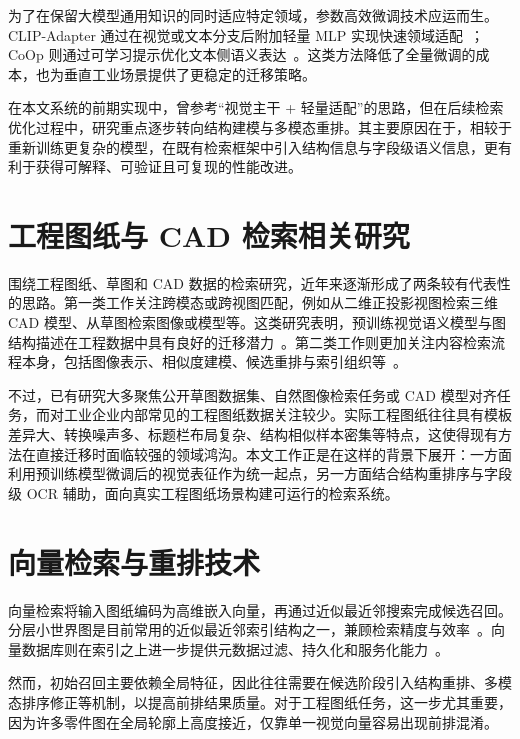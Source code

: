 为了在保留大模型通用知识的同时适应特定领域，参数高效微调技术应运而生。CLIP-Adapter 通过在视觉或文本分支后附加轻量 MLP 实现快速领域适配~\citep{gao2024clipadapter}；CoOp 则通过可学习提示优化文本侧语义表达~\citep{zhou2022coop}。这类方法降低了全量微调的成本，也为垂直工业场景提供了更稳定的迁移策略。

在本文系统的前期实现中，曾参考“视觉主干 + 轻量适配”的思路，但在后续检索优化过程中，研究重点逐步转向结构建模与多模态重排。其主要原因在于，相较于重新训练更复杂的模型，在既有检索框架中引入结构信息与字段级语义信息，更有利于获得可解释、可验证且可复现的性能改进。

\section{工程图纸与 CAD 检索相关研究}

围绕工程图纸、草图和 CAD 数据的检索研究，近年来逐渐形成了两条较有代表性的思路。第一类工作关注跨模态或跨视图匹配，例如从二维正投影视图检索三维 CAD 模型、从草图检索图像或模型等。这类研究表明，预训练视觉语义模型与图结构描述在工程数据中具有良好的迁移潜力~\citep{sain2023clipforallthings,mahajan2025orthocad,heidari2025geometriccad}。第二类工作则更加关注内容检索流程本身，包括图像表示、相似度建模、候选重排与索引组织等~\citep{zhang2023cbirsurvey,liu2024matchingreview,han2024crossmodalreview}。

不过，已有研究大多聚焦公开草图数据集、自然图像检索任务或 CAD 模型对齐任务，而对工业企业内部常见的工程图纸数据关注较少。实际工程图纸往往具有模板差异大、转换噪声多、标题栏布局复杂、结构相似样本密集等特点，这使得现有方法在直接迁移时面临较强的领域鸿沟。本文工作正是在这样的背景下展开：一方面利用预训练模型微调后的视觉表征作为统一起点，另一方面结合结构重排序与字段级 OCR 辅助，面向真实工程图纸场景构建可运行的检索系统。

\section{向量检索与重排技术}

向量检索将输入图纸编码为高维嵌入向量，再通过近似最近邻搜索完成候选召回。分层小世界图是目前常用的近似最近邻索引结构之一，兼顾检索精度与效率~\citep{malkov2018hnsw}。向量数据库则在索引之上进一步提供元数据过滤、持久化和服务化能力~\citep{pan2024vectordbsurvey,qdrant2024site}。

然而，初始召回主要依赖全局特征，因此往往需要在候选阶段引入结构重排、多模态排序修正等机制，以提高前排结果质量。对于工程图纸任务，这一步尤其重要，因为许多零件图在全局轮廓上高度接近，仅靠单一视觉向量容易出现前排混淆。

